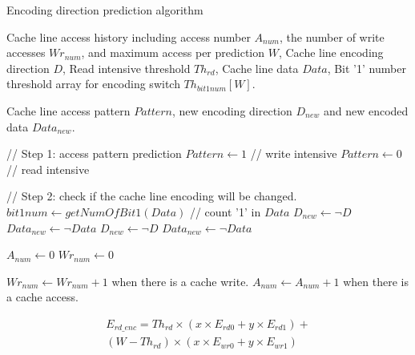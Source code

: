 \begin{algorithm}
    \renewcommand{\algorithmicrequire}{\textbf{Input:}}
	\renewcommand{\algorithmicensure}{\textbf{Output:}}
    \caption{Encoding direction prediction algorithm} 
    \label{alg:prediction}
    \footnotesize
	\begin{algorithmic}[1] 
	    \REQUIRE Cache line access history including access 
	    number $A_{num}$, the number of write accesses $Wr_{num}$, and 
	    maximum access per prediction $W$, Cache line encoding direction $D$, 
	    Read intensive threshold $Th_{rd}$, Cache line data $Data$, 
	    Bit '1' number threshold array for encoding switch $Th_{bit1num}[W]$.
	    
	    \ENSURE Cache line access pattern ${Pattern}$, new encoding direction $D_{new}$ and 
	    new encoded data $Data_{new}$.
	    
	        \STATE
	        \STATE // Step 1: access pattern prediction
	            \STATE $Pattern \gets 1$ // write intensive
	        \ELSE
	            \STATE $Pattern \gets 0$ // read intensive
	        \ENDIF

            \STATE
            \STATE // Step 2: check if the cache line encoding will be changed.
	        \STATE $bit1num \gets getNumOfBit1(Data)$ // count '1' in $Data$
	                \STATE $D_{new} \gets \lnot D$
	                \STATE $Data_{new} \gets \lnot Data$
	            \ENDIF
	       \ELSE
	                \STATE $D_{new} \gets \lnot D$
	                \STATE $Data_{new} \gets \lnot Data$
	            \ENDIF
	       \ENDIF
	       
	       \STATE $A_{num} \gets 0$
	       \STATE $Wr_{num} \gets 0$
	       
	    \ELSE
	    	\STATE $Wr_{num} \gets Wr_{num} + 1$ when there is a cache write.
	        \STATE $A_{num} \gets A_{num} + 1$ when there is a cache access.
	    \ENDIF
	 
	\end{algorithmic}
\end{algorithm}

\footnotesize
\begin{equation}
    \label{eq:read_encoding_energy}
    \begin{split}
    E_{rd\_enc}=Th_{rd} \times (x \times E_{rd0} + y \times E_{rd1}) + \\ (W - Th_{rd}) \times (x \times E_{wr0} + y \times E_{wr1}) \\
    \end{split}
\end{equation}


